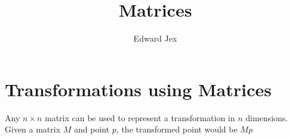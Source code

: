 \documentclass[a4paper,12pt]{article}
\begin{document}
\title{Matrices}	
\author{Edward Jex}
\maketitle
\section*{Transformations using Matrices}
Any $n \times n$ matrix can be used to represent a transformation in $n$ dimensions. Given a matrix $M$ and point $p$, the transformed point would be $Mp$
\end{document}

